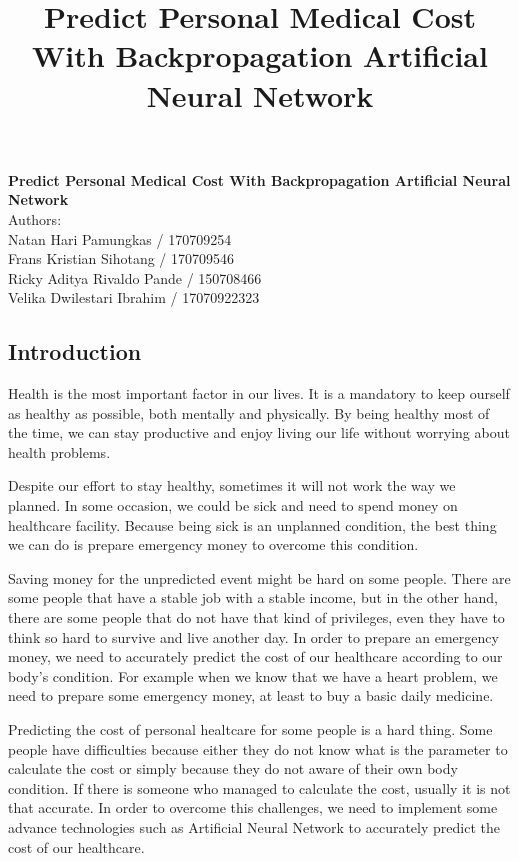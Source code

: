 \documentclass[a4paper, 12pt]{article}
\title{Predict Personal Medical Cost With Backpropagation Artificial Neural Network}
\date{}
\begin{document}
\centering
\textbf{\Large Predict Personal Medical Cost With Backpropagation Artificial Neural Network}\\
\vspace{0.5cm}
\small Authors:\\
\scriptsize Natan Hari Pamungkas / 170709254\\
\scriptsize Frans Kristian Sihotang / 170709546\\
\scriptsize Ricky Aditya Rivaldo Pande / 150708466\\
\scriptsize Velika Dwilestari Ibrahim / 17070922323\\

\begin{abstract}
\end{abstract}


\justifying
\begin{multicols}{2}
\section{Introduction}
Health is the most important factor in our lives. It is a mandatory to keep ourself as healthy as possible, both mentally and physically. By being healthy most of the time, we can stay productive and enjoy living our life without worrying about health problems.

Despite our effort to stay healthy, sometimes it will not work the way we planned. In some occasion, we could be sick and need to spend money on healthcare facility. Because being sick is an unplanned condition, the best thing we can do is prepare emergency money to overcome this condition.

Saving money for the unpredicted event might be hard on some people. There are some people that have a stable job with a stable income, but in the other hand, there are some people that do not have that kind of privileges, even they have to think so hard to survive and live another day. In order to prepare an emergency money, we need to accurately predict the cost of our healthcare according to our body's condition. For example when we know that we have a heart problem, we need to
  prepare some emergency money, at least to buy a basic daily medicine.

Predicting the cost of personal healtcare for some people is a hard thing. Some people have difficulties because either they do not know what is the parameter to calculate the cost or simply because they do not aware of their own body condition. If there is someone who managed to calculate the cost, usually it is not that accurate. In order to overcome this challenges, we need to implement some advance technologies such as Artificial Neural Network to accurately predict the cost
  of our healthcare.


\end{multicols}
\end{document}
